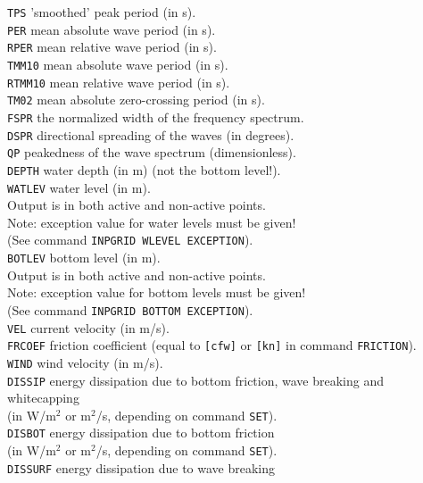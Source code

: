 \documentclass[12pt]{book}
\begin{document}
\begin{tabbing}
{\tt TPS}    \> 'smoothed' peak period (in s).\\
{\tt PER}    \> mean absolute wave period (in s).\\
{\tt RPER}   \> mean relative wave period (in s).\\
{\tt TMM10}  \> mean absolute wave period (in s).\\
{\tt RTMM10} \> mean relative wave period (in s).\\
{\tt TM02}   \> mean absolute zero-crossing period (in s).\\
{\tt FSPR}   \> the normalized width of the frequency spectrum.\\
{\tt DSPR}   \> directional spreading of the waves (in degrees).\\
{\tt QP}     \> peakedness of the wave spectrum (dimensionless).\\
{\tt DEPTH}  \> water depth (in m) (not the bottom level!).\\
{\tt WATLEV} \> water level (in m).\+\\
                Output is in both active and non-active points.\\
                Note: exception value for water levels must be given!\\
                (See command {\tt INPGRID WLEVEL EXCEPTION}).\-\\
{\tt BOTLEV} \> bottom level (in m).\+\\
                Output is in both active and non-active points.\\
                Note: exception value for bottom levels must be given!\\
                (See command {\tt INPGRID BOTTOM EXCEPTION}).\-\\
{\tt VEL}    \> current velocity (in m/s).\\
{\tt FRCOEF} \> friction coefficient (equal to {\tt [cfw]} or {\tt [kn]} in command {\tt FRICTION}).\\
{\tt WIND}   \> wind velocity (in m/s).\\
{\tt DISSIP} \> energy dissipation due to bottom friction, wave breaking and whitecapping\+\\
                (in W/m$^2$ or m$^2$/s, depending on command {\tt SET}).\-\\
{\tt DISBOT} \> energy dissipation due to bottom friction\+\\
                (in W/m$^2$ or m$^2$/s, depending on command {\tt SET}).\-\\
{\tt DISSURF} \> energy dissipation due to wave breaking\+\\

\end{tabbing}
\end{document}
